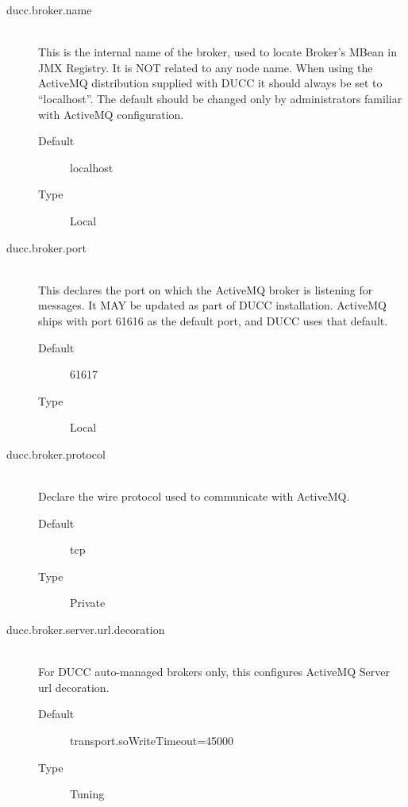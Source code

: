 \begin{description}
       \item[ducc.broker.name] \hfill \\
         This is the internal name of the broker, used to locate Broker's MBean in JMX Registry. 
         It is NOT related to any node name. When using the ActiveMQ distribution supplied with 
         DUCC it should always be set to ``localhost''.  The default should be changed only by
         administrators familiar with ActiveMQ configuration.
         \begin{description}
           \item[Default] localhost 
           \item[Type] Local              
         \end{description}


       \item[ducc.broker.port] \hfill \\
         This declares the port on which the ActiveMQ broker is listening for
         messages. It MAY be updated as part of DUCC installation. ActiveMQ ships with port
         61616 as the default port, and DUCC uses that default.         
         \begin{description}
           \item[Default] 61617              
           \item[Type] Local 
         \end{description}
             

       \item[ducc.broker.protocol] \hfill \\
         Declare the wire protocol used to communicate with ActiveMQ. 
         \begin{description}
           \item[Default] tcp 
           \item[Type] Private 
         \end{description}


       \item[ducc.broker.server.url.decoration] \hfill \\
         For DUCC auto-managed brokers only, this configures ActiveMQ Server url decoration.
         
         \begin{description}
           \item[Default] transport.soWriteTimeout=45000
           \item[Type] Tuning
         \end{description} 


\end{description}
